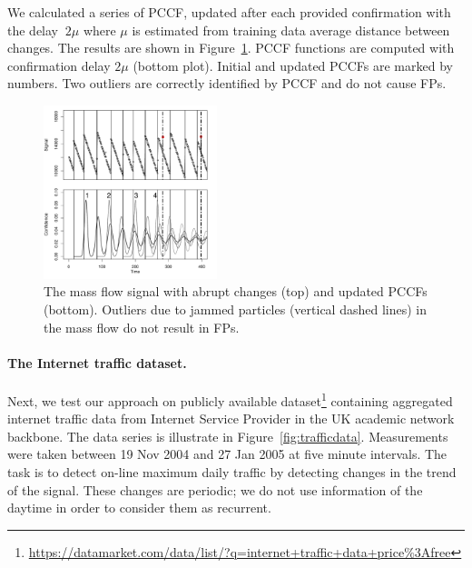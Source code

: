 We calculated a series of PCCF,  updated after each provided confirmation with the delay $~ 2 \mu$ where $\mu$ is estimated from training data average distance between changes.
The results are shown in Figure~\ref{fig:cfbsig}.
PCCF functions are computed with confirmation delay $2\mu$ (bottom plot). Initial and updated PCCFs are marked by numbers.
Two outliers are correctly identified by PCCF and do not cause FPs.
\begin{figure}[htb!]
\centering
\includegraphics[width = 0.45\textwidth, height = 0.35\textheight, ]{articles/pics/sdm_paper/cfbproof2.pdf}
\caption{
The mass flow signal with abrupt changes (top) and updated PCCFs (bottom).
Outliers due to jammed particles (vertical dashed lines) in the mass flow do not result in FPs.
}
\label{fig:cfbsig}
\end{figure}

\paragraph{The Internet traffic dataset.}
Next, we test our approach on publicly available dataset\footnote{\url{https://datamarket.com/data/list/?q=internet+traffic+data+price\%3Afree}} containing aggregated internet traffic data from Internet Service Provider in the UK academic network backbone. The data series is illustrate in Figure~\ref{fig:trafficdata}.
Measurements were taken between 19 Nov 2004 and 27 Jan 2005  at five minute intervals.
The task is to detect on-line maximum daily traffic by detecting changes in the trend of the signal.
These changes are periodic;  we do not use information of the daytime in order to consider them as recurrent.

